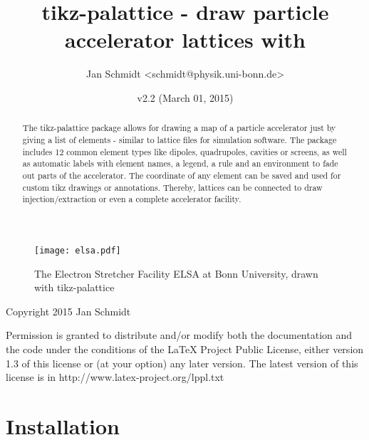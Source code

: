 \documentclass[a4paper]{scrartcl}
\author{Jan Schmidt <schmidt@physik.uni-bonn.de>}
\date{v2.2 (March 01, 2015)}
\title{tikz-palattice - draw particle accelerator lattices with \tikzlabel}
\begin{document}

\maketitle

\begin{abstract}
  The tikz-palattice package allows for drawing a map of a particle accelerator just by
  giving a list of elements - similar to lattice files for simulation software. The
  package includes 12 common element types like dipoles, quadrupoles, cavities or screens,
  as well as automatic labels with element names, a legend, a rule and an environment to
  fade out parts of the accelerator. The coordinate of any element can be saved and used
  for custom tikz drawings or annotations. Thereby, lattices can be connected to draw
  injection/extraction or even a complete accelerator facility.
\end{abstract}


\begin{figure}[h]
  \centering
  \texttt{[image: elsa.pdf]}
  \caption{The Electron Stretcher Facility ELSA at Bonn University, drawn with
    tikz-palattice}
\label{fig:elsa}
\end{figure}


\clearpage
\parindent=0pt
Copyright 2015 Jan Schmidt

\medskip
Permission is granted to distribute and/or modify both the documentation and the code
under the conditions of the LaTeX Project Public License, either version 1.3 of this
license or (at your option) any later version. The latest version of this license is in
http://www.latex-project.org/lppl.txt

\tableofcontents

\section{Installation}
\label{sec-1}
\end{document}
